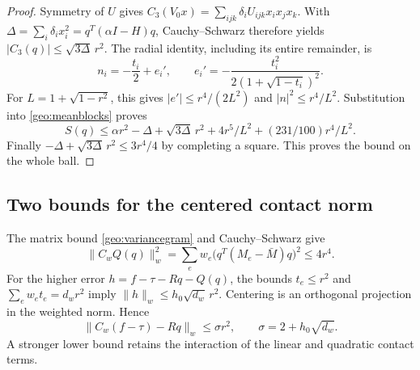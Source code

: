 \documentclass[12pt,reqno]{amsart}
\theoremstyle{definition}
\numberwithin{equation}{section}
\begin{document}
\begin{proof}
Symmetry of $U$ gives
$C_3(V_0x)=\sum_{ijk}\delta_iU_{ijk}x_ix_jx_k$.
With $\Delta=\sum_i\delta_ix_i^2=q^T(\alpha I-H)q$, Cauchy--Schwarz
therefore yields $|C_3(q)|\le\sqrt{3\Delta}\,r^2$.
The radial identity, including its entire remainder, is
\[
 n_i=-\frac{t_i}{2}+e_i',\qquad
 e_i'=-\frac{t_i^2}{2(1+\sqrt{1-t_i})^2}.
\]
For $L=1+\sqrt{1-r^2}$, this gives
$|e'|\le r^4/(2L^2)$ and $|n|^2\le r^4/L^2$.
Substitution into \eqref{geo:meanblocks} proves
\[
 S(q)\le\alpha r^2-\Delta+\sqrt{3\Delta}\,r^2
                       +4r^5/L^2+(231/100)r^4/L^2.
\]
Finally $-\Delta+\sqrt{3\Delta}\,r^2\le3r^4/4$ by completing a
square. This proves the bound on the whole ball.
\end{proof}

\subsection{Two bounds for the centered contact norm}
The matrix bound \eqref{geo:variancegram} and Cauchy--Schwarz give
\[
 \|C_wQ(q)\|_w^2
 =\sum_ew_e\bigl(q^T(M_e-\bar M)q\bigr)^2\le4r^4.
\]
For the higher error $h=f-\tau-Rq-Q(q)$, the bounds
$t_e\le r^2$ and $\sum_ew_et_e=d_wr^2$ imply
$\|h\|_w\le h_0\sqrt{d_w}\,r^2$.
Centering is an orthogonal projection in the weighted norm. Hence
\begin{equation}\label{geo:sigma}
 \|C_w(f-\tau)-Rq\|_w\le\sigma r^2,
 \qquad \sigma=2+h_0\sqrt{d_w}.
\end{equation}
A stronger lower bound retains the interaction of the linear and
quadratic contact terms.
\end{document}
